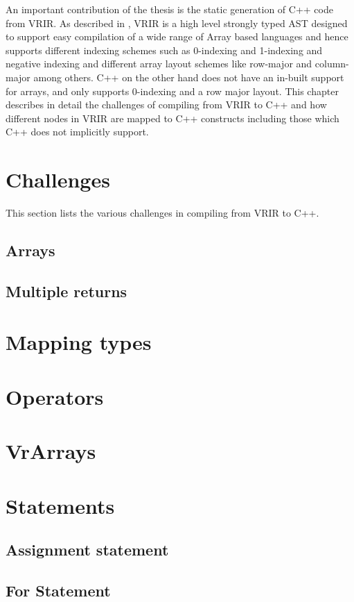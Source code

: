 An important contribution of the thesis is the static generation of C++ code from VRIR. As described in , VRIR is a high level strongly typed AST designed to support easy compilation of a wide range of Array based languages and hence supports different indexing schemes such as 0-indexing and 1-indexing and negative indexing and different array layout schemes like row-major and column-major  among others. C++ on the other hand does not have an in-built support for arrays, and only supports 0-indexing and a row major layout. This chapter describes in detail the challenges of compiling from VRIR to C++ and  how different nodes in VRIR are mapped to C++ constructs including those which C++ does not implicitly support.
\section{Challenges}
This section lists the various challenges in compiling from VRIR to C++.
\subsection{Arrays}
\subsection{Multiple returns}
\section{Mapping types}
\section{Operators}
\section{VrArrays}
\section{Statements}
\subsection{Assignment statement}
\subsection{For Statement}
